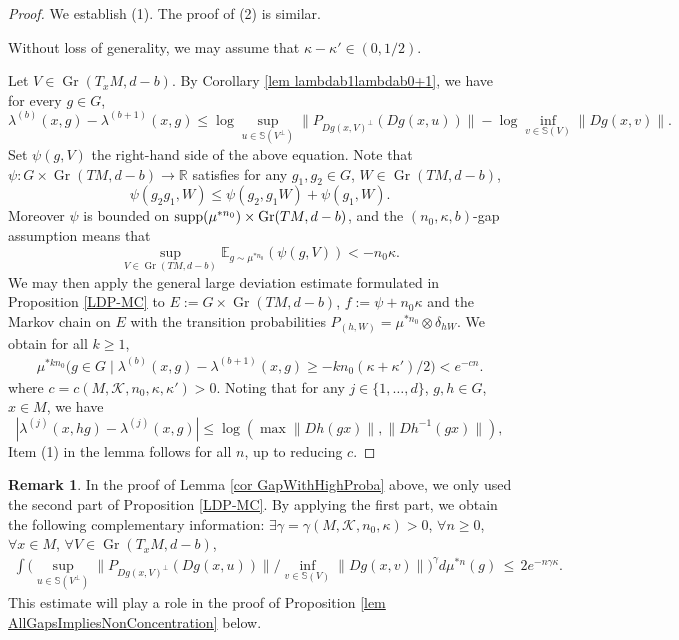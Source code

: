 \documentclass[11pt, leqno, fleqn]{amsart}
\def \R{{\mathbb R}}
\DeclareMathOperator{\Gr}{Gr}
\newcommand{\EV}{{\mathbb E}}
\newcommand{\cK}{{\mathcal K}}
\newcommand{\aryst}{\begin{eqnarray*}}
\newcommand{\earyst}{\end{eqnarray*}}
\theoremstyle{definition}
\newtheorem{rema}[thm]{\bf Remark}
\theoremstyle{definition}
\def\supp{{\rm supp}}
\def\S{ {\mathbb{S}} }
\begin{document}
		\begin{proof}
	We establish (1). The proof of (2) is similar. %
	
 
	Without loss of generality, we may assume that $\kappa - \kappa' \in (0, 1/2)$.
 
	
	Let $V\in \Gr(T_{x}M, d-b)$. By Corollary \ref{lem lambdab1lambdab0+1}, we have for every $g\in G$, 
	$$\lambda^{(b)}(x, g)  - \lambda^{(b+1)}(x, g) \leq  \log\sup_{u \in \S(  V^{\perp})}  \| P_{   Dg(x, V)^{\perp}}(  Dg(x, u) ) \|  - \log  \inf_{v \in \S(V)}  \| Dg(x, v) \|.$$
	Set $\psi(g,V)$ the right-hand side of the above equation. Note that $\psi:G\times \Gr(TM, d-b)\rightarrow \R$  satisfies for any $g_{1},g_{2}\in G$, $W\in \Gr(TM, d-b)$, 
	$$\psi(g_{2}g_{1},W) \leq \psi(g_{2}, g_{1}W)+ \psi(g_{1},W).$$
Moreover $\psi$ is bounded on $\supp (\mu^{*n_{0}}) \times \Gr(TM, d-b)$, and the  	$(n_{0},\kappa, b)$-gap assumption means that $$\sup_{V\in \Gr(TM, d-b)}\EV_{g\sim \mu^{*n_{0}}}(\psi(g,V))<-n_{0}\kappa.$$
	We may then apply the general large deviation estimate formulated in Proposition \ref{LDP-MC} to  $E:= G \times \Gr(TM, d-b)$, $f:=\psi +n_{0}\kappa$ and the Markov chain on $E$ with the transition probabilities
	$P_{(h, W)} =  \mu^{*n_{0}} \otimes \delta_{hW}$.  We obtain for all $k\geq1$,
	   \aryst 
		   \mu^{*kn_{0}} \Big (  g \in G \mid    \lambda^{(b)}(x, g)  -   \lambda^{(b + 1)}(x, g) \geq - kn_{0} (\kappa+\kappa')/2    \Big  ) <  e^{- c n }.
		   \earyst
	where $c=c(M, \cK, n_{0}, \kappa, \kappa')>0$. Noting that for any $j\in \{1, \dots, d\}$, $g,h\in G$, $x\in M$, we have
	$$|\lambda^{(j)}(x, hg)- \lambda^{(j)}(x,g)| \leq \log (\max\|Dh(gx)\|, \|Dh^{-1}(gx)\|),$$
	Item  (1)  in the lemma  follows  for all $n$, up to reducing $c$.
		\end{proof}
		
	 
	\begin{rema}\label{lem MomentBound} In the  proof of  Lemma \ref{cor GapWithHighProba} above, we only used the second part of Proposition \ref{LDP-MC}. By applying the first part, we obtain the following complementary information: $\exists \gamma=\gamma(M, \cK, n_{0}, \kappa) >0$, $\forall n\geq0$, $\forall x\in M$, $\forall V\in \Gr(T_{x}M, d-b)$,
		\aryst
			\int  \Big ( \sup_{u \in \S(V^{\perp})} \| P_{Dg(x, V)^{\perp}}(  Dg(x, u) ) \| /  \inf_{v \in \S(V)} \| Dg(x, v) \| \Big )^{\gamma} d\mu^{* n}(g) \,\leq \,2 e^{- n \gamma \kappa}.
			\earyst
This estimate will play a role in the proof of Proposition \ref{lem AllGapsImpliesNonConcentration}   below. 
	\end{rema}	
		
\end{document}
